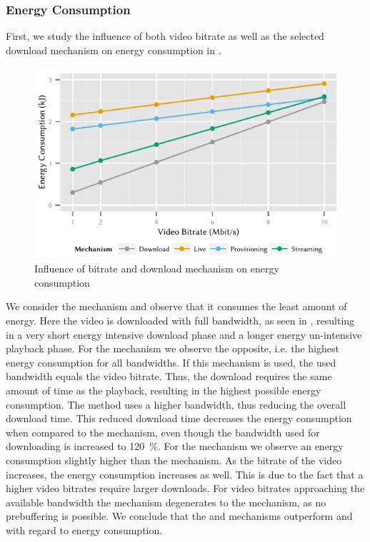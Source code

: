 \subsubsection*{Energy Consumption}\label{sec:application:lte_video:numerical_evaluation:energy_consumption}
First, we study the influence of both video bitrate as well as the selected download mechanism on energy consumption in .
\begin{figure}
  \centering
  \includegraphics{application/lte_video/numerical_evaluation/figures/bitrate2energy}
  \caption{Influence of bitrate and download mechanism on energy consumption}
  \label{fig:application:lte_video:numerical_evaluation:energy_consumption:bitrate2energy}
\end{figure}

We consider the \download mechanism and observe that it consumes the least amount of energy.
Here the video is downloaded with full bandwidth, as seen in , resulting in a very short energy intensive download phase and a longer energy un-intensive playback phase.
For the \live mechanism we observe the opposite, i.e. the highest energy consumption for all bandwidths.
If this mechanism is used, the used bandwidth equals the video bitrate.
Thus, the download requires the same amount of time as the playback, resulting in the highest possible energy consumption.
The \serviceprovisioning method uses a higher bandwidth, thus reducing the overall download time.
This reduced download time decreases the energy consumption when compared to the \live mechanism, even though the bandwidth used for downloading is increased to \SI{120}{\percent}.
For the \streaming mechanism we observe an energy consumption slightly higher than the \download mechanism.
As the bitrate of the video increases, the energy consumption increases as well.
This is due to the fact that a higher video bitrates require larger downloads.
For video bitrates approaching the available bandwidth the \streaming mechanism degenerates to the \live mechanism, as no prebuffering is possible.
We conclude that the \download and \streaming mechanisms outperform \live and \serviceprovisioning with regard to energy consumption.

